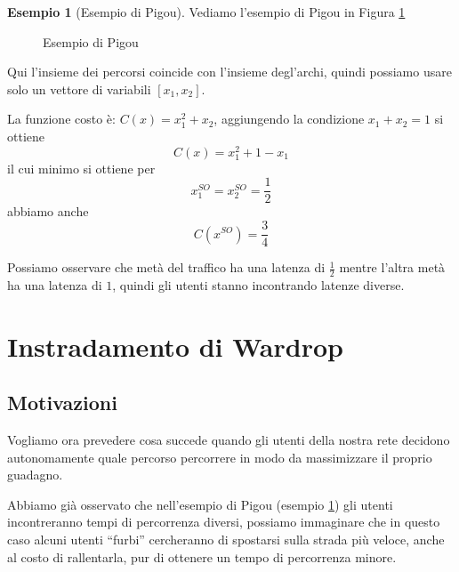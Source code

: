 \documentclass[a4paper]{article}
\newcounter{counter1}
\theoremstyle{plain}
\theoremstyle{definition}
\newtheorem{myes}[counter1]{Esempio}
\theoremstyle{remark}
\newcommand{\pa}[1]{\left(#1\right)}
\newcommand{\bra}[1]{\left[#1\right]}
\begin{document}
\begin{myes}[Esempio di Pigou]
  \label{es:esempio-pigou}
  Vediamo l'esempio di Pigou in Figura \ref{fig:esempio-pigou}
  \begin{figure}[ht]
    \centering
    \caption{Esempio di Pigou}
    \label{fig:esempio-pigou}
  \end{figure}
  Qui l'insieme dei percorsi coincide con l'insieme degl'archi, quindi
  possiamo usare solo un vettore di variabili $\bra{x_1, x_2}$.

  La funzione costo è: $C\pa{x} = x_1^2 + x_2$, aggiungendo la
  condizione $x_1 + x_2 = 1$ si ottiene
  \[ C\pa{x} = x_1 ^2 + 1 - x_1 \]
  il cui minimo si ottiene per
  \[ x^{SO}_1 = x^{SO}_2 = \frac{1}{2} \]
  abbiamo anche
  \[ C\pa{x^{SO}} = \frac{3}{4} \]

  Possiamo osservare che metà del traffico ha una latenza di
  $\frac{1}{2}$ mentre l'altra metà ha una latenza di $1$, quindi gli
  utenti stanno incontrando latenze diverse.
\end{myes}

\section{Instradamento di Wardrop}

\subsection{Motivazioni}
\label{sec:wardrop-motivazioni}

Vogliamo ora prevedere cosa succede quando gli utenti della nostra
rete decidono autonomamente quale percorso percorrere in modo da
massimizzare il proprio guadagno.

Abbiamo già osservato che nell'esempio di Pigou (esempio
\ref{es:esempio-pigou}) gli utenti incontreranno tempi di percorrenza
diversi, possiamo immaginare che in questo caso alcuni utenti
``furbi'' cercheranno di spostarsi sulla strada più veloce, anche al
costo di rallentarla, pur di ottenere un tempo di percorrenza minore.
\end{document}
